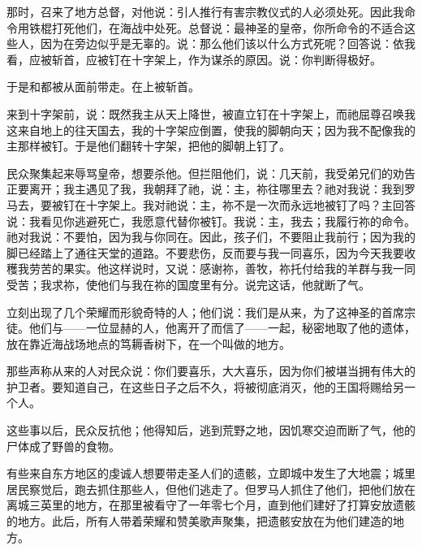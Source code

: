 那时，召来了地方总督，对他说：引人推行有害宗教仪式的人必须处死。因此我命令用铁棍打死他们，在海战中处死。总督说：最神圣的皇帝，你所命令的不适合这些人，因为在旁边似乎是无辜的。说：那么他们该以什么方式死呢？回答说：依我看，应被斩首，应被钉在十字架上，作为谋杀的原因。说：你判断得极好。\par

于是和都被从面前带走。在上被斩首。\par

来到十字架前，说：既然我主从天上降世，被直立钉在十字架上，而祂屈尊召唤我这来自地上的往天国去，我的十字架应倒置，使我的脚朝向天；因为我不配像我的主那样被钉。于是他们翻转十字架，把他的脚朝上钉了。\par

民众聚集起来辱骂皇帝，想要杀他。但拦阻他们，说：几天前，我受弟兄们的劝告正要离开；我主遇见了我，我朝拜了祂，说：主，祢往哪里去？祂对我说：我到罗马去，要被钉在十字架上。我对祂说：主，祢不是一次而永远地被钉了吗？主回答说：我看见你逃避死亡，我愿意代替你被钉。我说：主，我去；我履行祢的命令。祂对我说：不要怕，因为我与你同在。因此，孩子们，不要阻止我前行；因为我的脚已经踏上了通往天堂的道路。不要悲伤，反而要与我一同喜乐，因为今天我要收穫我劳苦的果实。他这样说时，又说：感谢祢，善牧，祢托付给我的羊群与我一同受苦；我求祢，使他们与我在祢的国度里有分。说完这话，他就断了气。\par

立刻出现了几个荣耀而形貌奇特的人；他们说：我们是从来，为了这神圣的首席宗徒。他们与——一位显赫的人，他离开了而信了——一起，秘密地取了他的遗体，放在靠近海战场地点的笃耨香树下，在一个叫做的地方。\par

那些声称从来的人对民众说：你们要喜乐，大大喜乐，因为你们被堪当拥有伟大的护卫者。要知道自己，在这些日子之后不久，将被彻底消灭，他的王国将赐给另一个人。\par

这些事以后，民众反抗他；他得知后，逃到荒野之地，因饥寒交迫而断了气，他的尸体成了野兽的食物。\par

有些来自东方地区的虔诚人想要带走圣人们的遗骸，立即城中发生了大地震；城里居民察觉后，跑去抓住那些人，但他们逃走了。但罗马人抓住了他们，把他们放在离城三英里的地方，在那里被看守了一年零七个月，直到他们建好了打算安放遗骸的地方。此后，所有人带着荣耀和赞美歌声聚集，把遗骸安放在为他们建造的地方。\par

